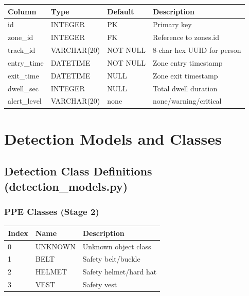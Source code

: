 \documentclass[12pt,a4paper,oneside]{book}
\begin{document}
\begin{tabular}{|l|l|l|p{6cm}|}
    \hline
    \textbf{Column} & \textbf{Type} & \textbf{Default} & \textbf{Description} \\
    \hline
    id & INTEGER & PK & Primary key \\
    \hline
    zone\_id & INTEGER & FK & Reference to zones.id \\
    \hline
    track\_id & VARCHAR(20) & NOT NULL & 8-char hex UUID for person \\
    \hline
    entry\_time & DATETIME & NOT NULL & Zone entry timestamp \\
    \hline
    exit\_time & DATETIME & NULL & Zone exit timestamp \\
    \hline
    dwell\_sec & INTEGER & NULL & Total dwell duration \\
    \hline
    alert\_level & VARCHAR(20) & none & none/warning/critical \\
    \hline
\end{tabular}

\chapter{Detection Models and Classes}

\section{Detection Class Definitions (detection\_models.py)}

\subsection{PPE Classes (Stage 2)}

\begin{tabular}{|l|l|l|}
    \hline
    \textbf{Index} & \textbf{Name} & \textbf{Description} \\
    \hline
    0 & UNKNOWN & Unknown object class \\
    \hline
    1 & BELT & Safety belt/buckle \\
    \hline
    2 & HELMET & Safety helmet/hard hat \\
    \hline
    3 & VEST & Safety vest \\
    \hline
\end{tabular}
\end{document}
